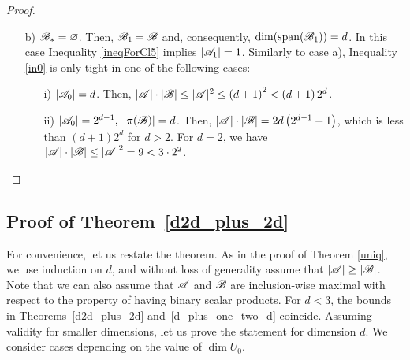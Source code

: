 \begin{proof}
\begin{enumerate}
\begin{enumerate}
\begin{enumerate}
            \end{enumerate}
            \item [b)] ${\mathscr{B}}_*=\varnothing$. Then, ${\mathscr{B}}_1 = {\mathscr{B}}$ and, consequently, $\operatorname{dim}(\operatorname{span}({\mathscr{B}}_1))=d$. In this case Inequality \ref{ineqForCl5} implies $|{\mathscr{A}}_1|=1$.
            Similarly to case a), Inequality \ref{in0} is only tight in one of the following cases:
            \begin{enumerate}
                \item[i)]$\left|{\mathscr{A}}_0\right|=d$. Then, $|{\mathscr{A}}|\cdot|{\mathscr{B}}| \leq |{\mathscr{A}}|^2 \leq \left(d+1\right)^2<\left(d+1\right)2^d$.
                \item[ii)]$\left|{\mathscr{A}}_0\right|=2^{d-1}\text{, }\left|\pi({\mathscr{B}})\right|=d$. Then, $\left|{\mathscr{A}}\right|\cdot\left|{\mathscr{B}}\right|=2d\left(2^{d-1}+1\right)$, which is less than $(d+1)2^d$ for $d>2$. For $d=2$, we have $\left|{\mathscr{A}}\right|\cdot\left|{\mathscr{B}}\right|\leq\left|{\mathscr{A}}\right|^2=9<3\cdot2^2$.
            \end{enumerate}
        \end{enumerate}
    \end{enumerate}
\end{proof}

\subsection{Proof of Theorem~\ref{d2d_plus_2d}}\label{sec32}


For convenience, let us restate the theorem.
\mainth*
    As in the proof of Theorem \ref{uniq}, we  use induction on $d$, and without loss of generality assume that $\left|{\mathscr{A}}\right|\geq\left|{\mathscr{B}}\right|$. Note that we can also assume that ${\mathscr{A}}$ and ${\mathscr{B}}$ are inclusion-wise maximal with respect to the property of having binary scalar products. For $d<3$, the bounds in Theorems~\ref{d2d_plus_2d} and~\ref{d_plus_one_two_d} coincide. Assuming validity for smaller dimensions, let us prove the statement for dimension $d$. We consider cases depending on the  value of $\operatorname{dim}U_0$.


